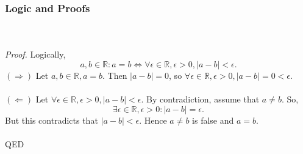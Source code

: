 \documentclass{article}
\begin{document}
    \subsubsection{Logic and Proofs}
        \\ \\ 
        \textit{Proof.} Logically,
        \begin{equation*}
            a,b \in \mathbb{R}: a=b \iff \forall \epsilon \in \mathbb{R}, \epsilon > 0, |a-b|<\epsilon.
        \end{equation*}
        $(\Rightarrow)$ Let $a,b \in \mathbb{R}, a=b$. Then $|a-b|=0$, so $\forall \epsilon \in \mathbb{R}, \epsilon > 0, |a-b| = 0 <\epsilon$.
        \\ \\
        $(\Leftarrow)$ Let $\forall \epsilon \in \mathbb{R}, \epsilon > 0, |a-b|<\epsilon$. By contradiction, assume that $a \neq b$. So,
        \begin{equation*}
            \exists \epsilon \in \mathbb{R}, \epsilon > 0: |a-b| = \epsilon.
        \end{equation*}
        But this contradicts that $|a-b| < \epsilon$. Hence $a \neq b$ is false and $a=b$. \\ \\
        QED
    
\end{document}

